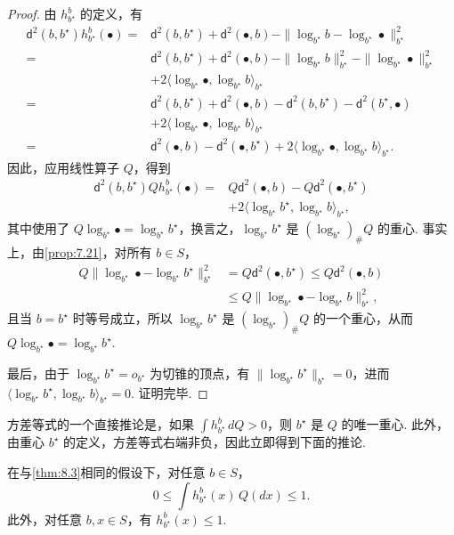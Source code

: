 \begin{proof}
由 $h_{b^\star}^b$ 的定义，有
$$\begin{aligned}
\mathsf d^2(b,b^\star)h_{b^\star}^b(\bullet)
={}&\mathsf d^2(b,b^\star)+\mathsf d^2(\bullet,b)
-\|\log_{b^\star}b-\log_{b^\star}\bullet\|_{b^\star}^2\\
={}&\mathsf d^2(b,b^\star)+\mathsf d^2(\bullet,b)
-\|\log_{b^\star}b\|_{b^\star}^2-\|\log_{b^\star}\bullet\|_{b^\star}^2\\
&+2\langle\log_{b^\star}\bullet,\log_{b^\star}b\rangle_{b^\star}\\
={}&\mathsf d^2(b,b^\star)+\mathsf d^2(\bullet,b)
-\mathsf d^2(b,b^\star)-\mathsf d^2(b^\star,\bullet)\\
&+2\langle\log_{b^\star}\bullet,\log_{b^\star}b\rangle_{b^\star}\\
={}&\mathsf d^2(\bullet,b)-\mathsf d^2(\bullet,b^\star)
+2\langle\log_{b^\star}\bullet,\log_{b^\star}b\rangle_{b^\star}.
\end{aligned}$$
因此，应用线性算子 $Q$，得到
$$\begin{aligned}
\mathsf d^2(b,b^\star)Qh_{b^\star}^b(\bullet)
={}&Q\mathsf d^2(\bullet,b)-Q\mathsf d^2(\bullet,b^\star)\\
&+2\langle\log_{b^\star}b^\star,\log_{b^\star}b\rangle_{b^\star},
\end{aligned}$$
其中使用了 $Q\log_{b^\star}\bullet=\log_{b^\star}b^\star$，换言之，$\log_{b^\star}b^\star$ 是 $(\log_{b^\star})_\#Q$ 的重心. 事实上，由\autoref{prop:7.21}，对所有 $b\in S$，
$$\begin{aligned}
Q\|\log_{b^\star}\bullet-\log_{b^\star}b^\star\|_{b^\star}^2
&=Q\mathsf d^2(\bullet,b^\star)\le Q\mathsf d^2(\bullet,b)\\
&\le Q\|\log_{b^\star}\bullet-\log_{b^\star}b\|_{b^\star}^2,
\end{aligned}$$
且当 $b=b^\star$ 时等号成立，所以 $\log_{b^\star}b^\star$ 是 $(\log_{b^\star})_\#Q$ 的一个重心，从而 $Q\log_{b^\star}\bullet=\log_{b^\star}b^\star$.

最后，由于 $\log_{b^\star}b^\star=o_{b^\star}$ 为切锥的顶点，有 $\|\log_{b^\star}b^\star\|_{b^\star}=0$，进而 $\langle\log_{b^\star}b^\star,\log_{b^\star}b\rangle_{b^\star}=0$. 证明完毕.
\end{proof}

方差等式的一个直接推论是，如果 $\int h_{b^\star}^b\,dQ>0$，则 $b^\star$ 是 $Q$ 的唯一重心. 此外，由重心 $b^\star$ 的定义，方差等式右端非负，因此立即得到下面的推论.
\begin{corollary}\label{cor:8.4}
在与\autoref{thm:8.3}相同的假设下，对任意 $b\in S$，
$$0\le\int h_{b^\star}^b(x)\,Q(dx)\le1.$$
此外，对任意 $b,x\in S$，有 $h_{b^\star}^b(x)\le1$.
\end{corollary}

